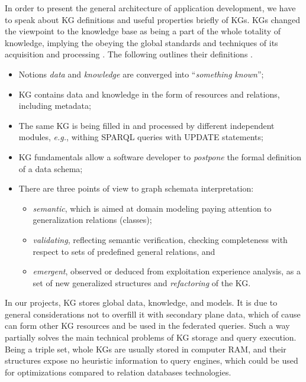 \documentclass[
]{ceurart}
\begin{document}
In order to present the general architecture of application development, we have to speak about KG definitions and useful properties briefly of KGs.
KGs changed the viewpoint to the knowledge base as being a part of the whole totality of knowledge, implying the obeying the global standards and techniques of its acquisition and processing \cite{hogan}.  The following outlines their definitions \cite{hogan}.
 \begin{itemize}
  \item Notions \emph{data} and \emph{knowledge} are converged into ``\emph{something} \emph{known}'';
  \item KG contains data and knowledge in the form of resources and relations, including metadata;
  \item The same KG is being filled in and processed by different independent modules, \emph{e.g.}, withing SPARQL queries with UPDATE statements;
  \item KG fundamentals allow a software developer to \emph{postpone} the formal definition of a data schema;
  \item There are three points of view to graph schemata interpretation:
    \begin{itemize}
    \item \emph{semantic}, which is aimed at domain modeling paying attention to generalization relations (classes);
    \item \emph{validating}, reflecting semantic verification, checking completeness with respect to sets of predefined general relations, and
    \item \emph{emergent}, observed or deduced from exploitation experience analysis, as a set of new generalized structures and \emph{refactoring} of the KG.
    \end{itemize}
  \end{itemize}

In our projects, KG stores global data, knowledge, and models.  It is due to general considerations not to overfill it with secondary plane data, which of cause can form other KG resources and be used in the federated queries.  Such a way partially solves the main technical problems of KG storage and query execution.  Being a triple set, whole KGs are usually stored in computer RAM, and their structures expose no heuristic information to query engines, which could be used for optimizations compared to relation databases technologies.
\end{document}
